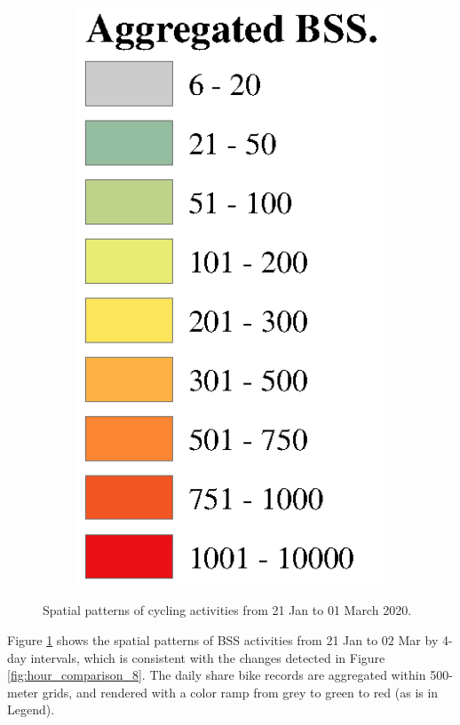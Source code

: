 \documentclass[preprints,article,accept,moreauthors,pdftex]{Definitions/mdpi}
\begin{document}
\begin{figure}[ht]
\begin{subfigure}{.13\textwidth}
        \includegraphics[width=\textwidth]{Figures/Overall_spatial_patterns/legend5.eps}
    \end{subfigure}
    \caption{Spatial patterns of cycling activities from 21 Jan to 01 March 2020.}
    \label{fig:full_spatial_pattern_2020}
\end{figure}

Figure \ref{fig:full_spatial_pattern_2020} shows the spatial patterns of BSS activities from 21 Jan to 02 Mar by 4-day intervals, which is consistent with the changes detected in Figure \ref{fig:hour_comparison_8}. %
The daily share bike records are aggregated within 500-meter grids, and rendered with a color ramp from grey to green to red (as is in Legend).
\end{document}
